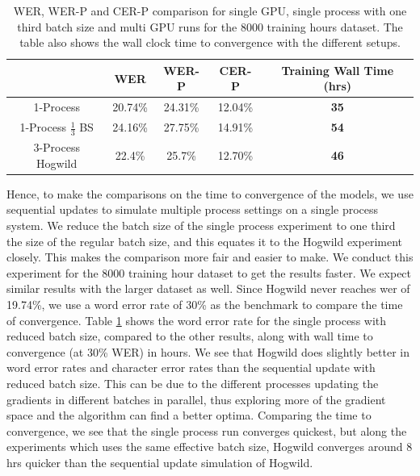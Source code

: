 \begin{table}[ht]
\centering
\begin{tabular}{c | c c c | c }
\hline
     & WER & WER-P & CER-P & Training Wall Time (hrs)\\
 \hline
  1-Process & 20.74\% & 24.31\% & 12.04\% & \textbf{35} \\
  1-Process $\frac{1}{3}$ BS & 24.16\% & 27.75\% & 14.91\% & \textbf{54} \\
  3-Process Hogwild & 22.4\% & 25.7\% & 12.70\% & \textbf{46} \\
 \hline
\end{tabular}
\caption{\label{table:wer_hog_seq} WER, WER-P and CER-P comparison for single GPU, single process with one third batch size and multi GPU runs for the 8000 training hours dataset. The table also shows the wall clock time to convergence with the different setups.}
\end{table}

Hence, to make the comparisons on the time to convergence of the models, we use sequential updates to simulate multiple process settings on a single process system. We reduce the batch size of the single process experiment to one third the size of the regular batch size, and this equates it to the Hogwild experiment closely. This makes the comparison more fair and easier to make. We conduct this experiment for the 8000 training hour dataset to get the results faster.  We expect similar results with the larger dataset as well. Since Hogwild never reaches \acrshort{wer} of 19.74\%, we use a word error rate of 30\% as the benchmark to compare the time of convergence. Table \ref{table:wer_hog_seq} shows the word error rate for the single process with reduced batch size, compared to the other results, along with  wall time to convergence (at 30\% WER) in hours. We see that Hogwild does slightly better in word error rates and character error rates than the sequential update with reduced batch size. This can be due to the different processes updating the gradients in different batches in parallel, thus exploring more of the gradient space and the algorithm can find a better optima. Comparing the time to convergence, we see that the single process run converges quickest, but along the experiments which uses the same effective batch size, Hogwild converges around 8 hrs quicker than the sequential update simulation of Hogwild. 

